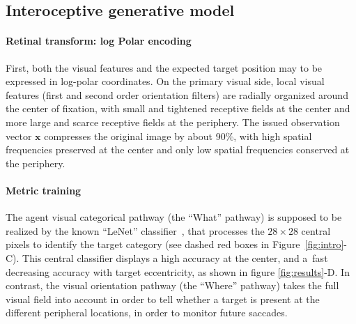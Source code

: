\subsection{Interoceptive generative model}


\paragraph{Retinal transform: log Polar encoding}

First, both the visual features and the expected target position may to be expressed in log-polar coordinates. On the primary visual side, local visual features (first and second order orientation filters) are radially organized around the center of fixation, with small and tightened receptive fields at the center and more large and scarce receptive fields at the periphery. The issued observation vector $\boldsymbol{x}$ compresses the original image by about 90\%, with high spatial frequencies preserved at the center and only low spatial frequencies conserved at the periphery.


\paragraph{Metric training}






The agent visual categorical pathway (the ``What'' pathway) is supposed to be realized by the known ``LeNet'' classifier~\citep{Lecun1998}, that processes the $28 \times 28$ central pixels to identify the target category (see dashed red boxes in  Figure~\ref{fig:intro}-C). This central classifier displays a high accuracy at the center, and a fast decreasing accuracy with target eccentricity, as shown in figure \ref{fig:results}-D. In contrast, the visual orientation pathway (the ``Where'' pathway) takes the full visual field into account in order to tell whether a target is present at the different peripheral locations, in order to monitor future saccades.

